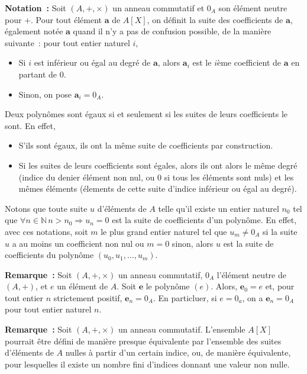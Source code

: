 \noindent\textbf{Notation :} 
    Soit $(A, +, \times)$ un anneau commutatif et $0_A$ son élément neutre pour $+$.
    Pour tout élément $\mathbf{a}$ de $A[X]$, on définit la suite des coefficients de $\mathbf{a}$, également notée $\mathbf{a}$ quand il n'y a pas de confusion possible, de la manière suivante : pour tout entier naturel $i$, 
\begin{itemize}[nosep]
    \item Si $i$ est inférieur ou égal au degré de $\mathbf{a}$, alors $\mathbf{a}_i$ est le $i$ème coefficient de $\mathbf{a}$ en partant de $0$.
    \item Sinon, on pose $\mathbf{a}_i = 0_A$.
\end{itemize}
Deux polynômes sont égaux si et seulement si les suites de leurs coefficients le sont.
En effet, 
\begin{itemize}[nosep]
    \item S'ils sont égaux, ils ont la même suite de coefficients par construction.
    \item Si les suites de leurs coefficients sont égales, alors ils ont alors le même degré (indice du denier élément non nul, ou $0$ si tous les éléments sont nuls) et les mêmes éléments (élements de cette suite d'indice inférieur ou égal au degré).
\end{itemize}
Notons que toute suite $u$ d'éléments de $A$ telle qu'il existe un entier naturel $n_0$ tel que $\forall n \in \mathbb{N} \, n > n_0 \Rightarrow u_n = 0$ est la suite de coefficients d'un polynôme. 
En effet, avec ces notations, soit $m$ le plus grand entier naturel tel que $u_m \neq 0_A$ si la suite $u$ a au moins un coefficient non nul ou $m = 0$ sinon, alors $u$ est la suite de coefficients du polynôme $(u_0, u_1, \dots, u_m)$.

\medskip

\noindent\textbf{Remarque :} 
    Soit $(A, +, \times)$ un anneau commutatif, $0_A$ l'élément neutre de $(A, +)$, et $e$ un élément de $A$.
    Soit $\mathbf{e}$ le polynôme $(e)$.
    Alors, $\mathbf{e}_0 = e$ et, pour tout entier $n$ strictement positif, $\mathbf{e}_n = 0_A$.
    En particluer, si $e = 0_a$, on a $\mathbf{e}_n = 0_A$ pour tout entier naturel $n$.

\medskip

\noindent\textbf{Remarque :} 
    Soit $(A, +, \times)$ un anneau commutatif.
    L'ensemble $A[X]$ pourrait être défini de manière presque équivalente par l'ensemble des suites d'éléments de $A$ nulles à partir d'un certain indice, ou, de manière équivalente, pour lesquelles il existe un nombre fini d'indices donnant une valeur non nulle.

